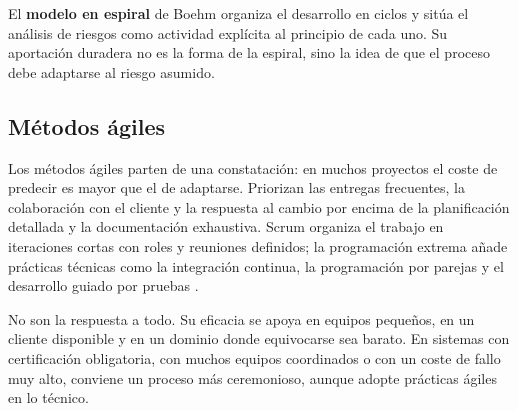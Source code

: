 El \textbf{modelo en espiral} de Boehm organiza el desarrollo en ciclos y sitúa el
análisis de riesgos como actividad explícita al principio de cada uno. Su
aportación duradera no es la forma de la espiral, sino la idea de que el proceso
debe adaptarse al riesgo asumido.

\subsection*{Métodos ágiles}

Los métodos ágiles parten de una constatación: en muchos proyectos el coste de
predecir es mayor que el de adaptarse. Priorizan las entregas frecuentes, la
colaboración con el cliente y la respuesta al cambio por encima de la planificación
detallada y la documentación exhaustiva. Scrum organiza el trabajo en iteraciones
cortas con roles y reuniones definidos; la programación extrema añade prácticas
técnicas como la integración continua, la programación por parejas y el desarrollo
guiado por pruebas \cite{beck2002,lasa2017}.

No son la respuesta a todo. Su eficacia se apoya en equipos pequeños, en un cliente
disponible y en un dominio donde equivocarse sea barato. En sistemas con
certificación obligatoria, con muchos equipos coordinados o con un coste de fallo
muy alto, conviene un proceso más ceremonioso, aunque adopte prácticas ágiles en
lo técnico.
